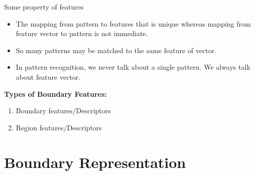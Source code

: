\begin{frame}{Some property of features}
\begin{itemize}
\item The mapping from pattern to features that is unique whereas mapping from feature vector to pattern is not immediate.
\item So many patterns may be matched to the same feature of vector.
\item In pattern recognition, we never talk about a single pattern. We always talk about {\color{maroon}feature vector}.
\end{itemize}
\vspace{12pt}
\textbf{Types of Boundary Features:}
\begin{enumerate}
\item Boundary features/Descriptors
\item Region features/Descriptors
\end{enumerate}
\end{frame}

\section{Boundary Representation}
